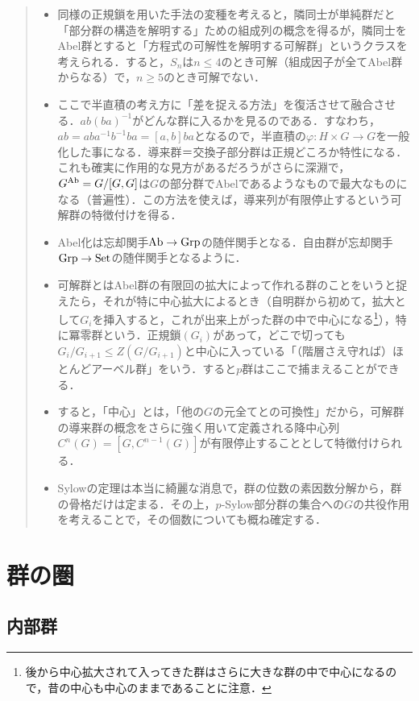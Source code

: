 \documentclass[uplatex,dvipdfmx]{jsreport}
\begin{document}
\begin{quotation}
\begin{itemize}
        \item 同様の正規鎖を用いた手法の変種を考えると，隣同士が単純群だと「部分群の構造を解明する」ための組成列の概念を得るが，隣同士をAbel群とすると「方程式の可解性を解明する可解群」というクラスを考えられる．すると，$S_n$は$n\le 4$のとき可解（組成因子が全てAbel群からなる）で，$n\ge 5$のとき可解でない．
        \item ここで半直積の考え方に「差を捉える方法」を復活させて融合させる．$ab(ba)^{-1}$がどんな群に入るかを見るのである．すなわち，$ab=aba^{-1}b^{-1}ba=[a,b]ba$となるので，半直積の$\varphi:H\times G\to G$を一般化した事になる．導来群＝交換子部分群は正規どころか特性になる．これも確実に作用的な見方があるだろうがさらに深淵で，$G^{\mathrm{Ab}}=G/[G,G]$は$G$の部分群でAbelであるようなもので最大なものになる（普遍性）．この方法を使えば，導来列が有限停止するという可解群の特徴付けを得る．
        \item Abel化は忘却関手$\mathrm{Ab}\to\mathrm{Grp}$の随伴関手となる．自由群が忘却関手$\mathrm{Grp}\to\mathrm{Set}$の随伴関手となるように．
        \item 可解群とはAbel群の有限回の拡大によって作れる群のことをいうと捉えたら，それが特に中心拡大によるとき（自明群から初めて，拡大として$G_i$を挿入すると，これが出来上がった群の中で中心になる\footnote{後から中心拡大されて入ってきた群はさらに大きな群の中で中心になるので，昔の中心も中心のままであることに注意．}），特に冪零群という．正規鎖$(G_i)$があって，どこで切っても$G_i/G_{i+1}\le Z(G/G_{i+1})$と中心に入っている「（階層さえ守れば）ほとんどアーベル群」をいう．すると$p$群はここで捕まえることができる．
        \item すると，「中心」とは，「他の$G$の元全てとの可換性」だから，可解群の導来群の概念をさらに強く用いて定義される降中心列$C^n(G)=[G,C^{n-1}(G)]$が有限停止することとして特徴付けられる．
        \item Sylowの定理は本当に綺麗な消息で，群の位数の素因数分解から，群の骨格だけは定まる．その上，$p$-Sylow部分群の集合への$G$の共役作用を考えることで，その個数についても概ね確定する．
    \end{itemize}
\end{quotation}

\section{群の圏}

\subsection{内部群}
\end{document}
